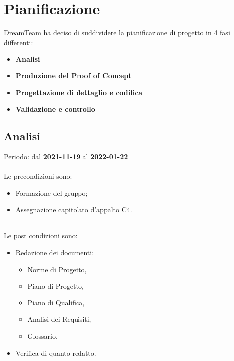 \section{Pianificazione}
DreamTeam ha deciso di suddividere la pianificazione di progetto in 4 fasi differenti:

\begin{itemize}
\item \textbf{Analisi}
\item \textbf{Produzione del Proof of Concept}
\item \textbf{Progettazione di dettaglio e codifica}
\item \textbf{Validazione e controllo}
\end{itemize}

\subsection{Analisi} 

Periodo: dal \textbf{2021-11-19} al \textbf{2022-01-22}  \mbox{} \\ \mbox{} \\
Le precondizioni sono:
\begin{itemize}
\item Formazione del gruppo;
\item Assegnazione capitolato d’appalto C4.
\end{itemize}  \mbox{} \\
Le post condizioni sono:
\begin{itemize}
\item Redazione dei documenti:
\begin{itemize}
	\item Norme di Progetto,
	\item Piano di Progetto,
	\item Piano di Qualifica,
	\item Analisi dei Requisiti,
	\item Glossario.
\end{itemize}
\item Verifica di quanto redatto.
\end{itemize}






